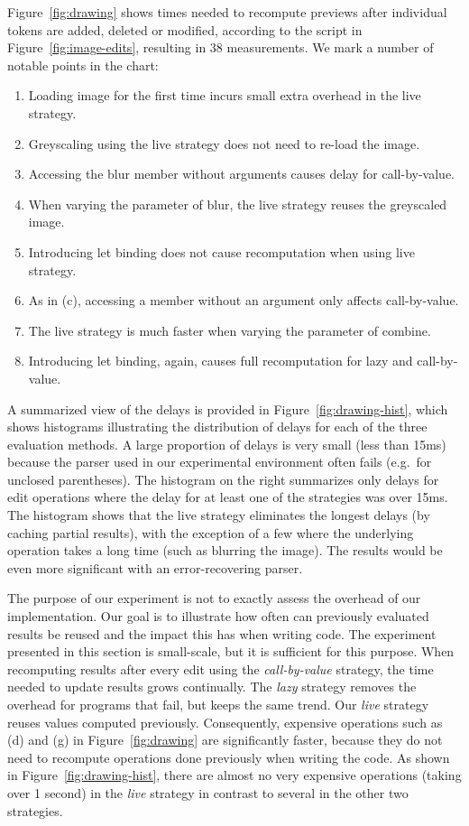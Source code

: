 \documentclass[english,crc]{programming}
\theoremstyle{plain}
\theoremstyle{definition}
\begin{document}
Figure~\ref{fig:drawing} shows times needed to recompute previews after individual tokens
are added, deleted or modified, according to the script in
Figure~\ref{fig:image-edits}, resulting in 38 measurements. We mark a number of notable points in the chart:

\begin{enumerate}[itemsep=0.1em,label=\alph*.]
\item Loading image for the first time incurs small extra overhead in the live strategy.
\item Greyscaling using the live strategy does not need to re-load the image.
\item Accessing the blur member without arguments causes delay for call-by-value.
\item When varying the parameter of blur, the live strategy reuses the greyscaled image.
\item Introducing let binding does not cause recomputation when using live strategy.
\item As in (c), accessing a member without an argument only affects call-by-value.
\item The live strategy is much faster when varying the parameter of combine.
\item Introducing let binding, again, causes full recomputation for lazy and call-by-value.
\end{enumerate}

\noindent
A summarized view of the delays is provided in Figure~\ref{fig:drawing-hist}, which shows
histograms illustrating the distribution of delays for each of the three evaluation methods.
A large proportion of delays is very small (less than 15ms) because the parser used in our
experimental environment often fails (e.g.~for unclosed parentheses). The histogram
on the right summarizes only delays for edit operations where the delay for at least one of
the strategies was over 15ms. The histogram shows that the live strategy eliminates the longest
delays (by caching partial results), with the exception of a few where the underlying operation
takes a long time (such as blurring the image). The results would be even more significant with
an error-recovering parser.

The purpose of our experiment is not to exactly assess the overhead of our implementation.
Our goal is to illustrate how often can previously evaluated results be reused and the impact
this has when writing code. The experiment presented in this section is small-scale, but it is
sufficient for this purpose. When recomputing results after every edit
using the \emph{call-by-value} strategy, the time needed to update results grows
continually. The \emph{lazy} strategy removes the overhead for programs that fail, but
keeps the same trend. Our \emph{live} strategy reuses values computed
previously. Consequently, expensive operations such as (d) and (g) in Figure~\ref{fig:drawing}
are significantly faster, because they do not need to recompute operations done previously when
writing the code. As shown in Figure~\ref{fig:drawing-hist}, there are almost no very expensive
operations (taking over 1 second) in the \emph{live} strategy in contrast to several in the
other two strategies.
\end{document}
